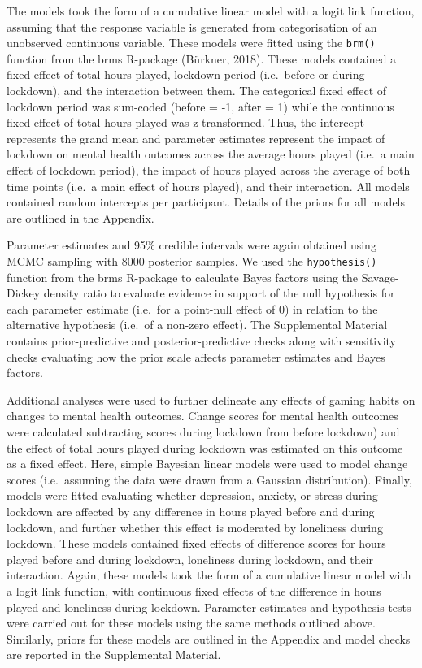 \documentclass[
  english,
  man,floatsintext]{apa6}
\begin{document}
The models took the form of a cumulative linear model with a logit link function, assuming that the response variable is generated from categorisation of an unobserved continuous variable. These models were fitted using the \texttt{brm()} function from the brms R-package (Bürkner, 2018). These models contained a fixed effect of total hours played, lockdown period (i.e.~before or during lockdown), and the interaction between them. The categorical fixed effect of lockdown period was sum-coded (before = -1, after = 1) while the continuous fixed effect of total hours played was z-transformed. Thus, the intercept represents the grand mean and parameter estimates represent the impact of lockdown on mental health outcomes across the average hours played (i.e.~a main effect of lockdown period), the impact of hours played across the average of both time points (i.e.~a main effect of hours played), and their interaction. All models contained random intercepts per participant. Details of the priors for all models are outlined in the Appendix.

Parameter estimates and 95\% credible intervals were again obtained using MCMC sampling with 8000 posterior samples. We used the \texttt{hypothesis()} function from the brms R-package to calculate Bayes factors using the Savage-Dickey density ratio to evaluate evidence in support of the null hypothesis for each parameter estimate (i.e.~for a point-null effect of 0) in relation to the alternative hypothesis (i.e.~of a non-zero effect). The Supplemental Material contains prior-predictive and posterior-predictive checks along with sensitivity checks evaluating how the prior scale affects parameter estimates and Bayes factors.

Additional analyses were used to further delineate any effects of gaming habits on changes to mental health outcomes. Change scores for mental health outcomes were calculated subtracting scores during lockdown from before lockdown) and the effect of total hours played during lockdown was estimated on this outcome as a fixed effect. Here, simple Bayesian linear models were used to model change scores (i.e.~assuming the data were drawn from a Gaussian distribution). Finally, models were fitted evaluating whether depression, anxiety, or stress during lockdown are affected by any difference in hours played before and during lockdown, and further whether this effect is moderated by loneliness during lockdown. These models contained fixed effects of difference scores for hours played before and during lockdown, loneliness during lockdown, and their interaction. Again, these models took the form of a cumulative linear model with a logit link function, with continuous fixed effects of the difference in hours played and loneliness during lockdown. Parameter estimates and hypothesis tests were carried out for these models using the same methods outlined above. Similarly, priors for these models are outlined in the Appendix and model checks are reported in the Supplemental Material.
\end{document}
